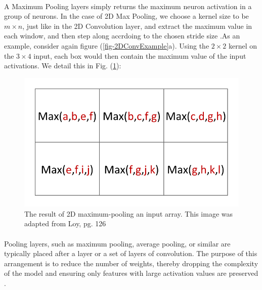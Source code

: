\documentclass[12pt,letterpaper]{article}
\begin{document}
\paragraph*{}A Maximum Pooling layers simply returns the maximum neuron activation in a group of neurons. In the case of 2D Max Pooling, we choose a kernel size to be $m \times n$, just like in the 2D Convolution layer, and extract the maximum value in each window, and then step along accrdoing to the chosen stride size \cite{Loy,Goodfellow}.As an example, consider again figure (\ref{fig-2DConvExample}a). Using the $2 \times 2$ kernel on the $3 \times 4$ input, each box would then contain the maximum value of the input activations. We detail this in Fig. (\ref{fig-2DMaxPool}):
\begin{figure}[h]

\begin{center}
\includegraphics[scale=0.6]{../figures/2DConvExample(d)}
\end{center}
\caption{The result of 2D maximum-pooling an input array. This image was adapted from Loy, pg. 126 \cite{Loy}}
\label{fig-2DMaxPool}
\end{figure} 

\paragraph*{}Pooling layers, such as maximum pooling, average pooling, or similar are typically placed after a layer or a set of layers of convolution. The purpose of this arrangement is to reduce the number of weights, thereby dropping the complexity of the model and ensuring only features with large activation values are preserved \cite{Geron,Loy,Goodfellow}.

\end{document}
